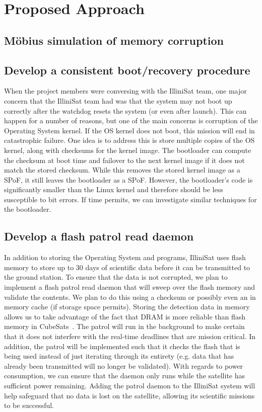 \section{Proposed Approach}
\subsection{M\"obius simulation of memory corruption}

\subsection{Develop a consistent boot/recovery procedure}
When the project members were conversing with the IlliniSat team, one major
concern that the IlliniSat team had was that the system may not boot up
correctly after the watchdog resets the system (or even after launch).  This can
happen for a number of reasons, but one of the main concerns is corruption of
the Operating System kernel.  If the OS kernel does not boot, this mission will
end in catastrophic failure.  One idea is to address this is store multiple
copies of the OS kernel, along with checksums for the kernel image.  The
bootloader can compute the checksum at boot time and failover to the next kernel
image if it does not match the stored checksum.  While this removes the stored
kernel image as a SPoF, it still leaves the bootloader as a SPoF.  However, the
bootloader's code is significantly smaller than the Linux kernel and therefore
should be less susceptible to bit errors.  If time permits, we can investigate
similar techniques for the bootloader. 

\subsection{Develop a flash patrol read daemon}
In addition to storing the Operating System and programs, IlliniSat uses flash
memory to store up to 30 days of scientific data before it can be transmitted to
the ground station.  To ensure that the data is not corrupted, we plan to
implement a flash patrol read daemon that will sweep over the flash memory and
validate the contents. We plan to do this using a checksum or possibly even an
in memory cache (if storage space permits).  Storing the detection data in
memory allows us to take advantage of the fact that DRAM is more reliable than
flash memory in CubeSats~\cite{odegaard2013error}.  The patrol will run in the
background to make certain that it does not interfere with the real-time
deadlines that are mission critical.  In addition, the patrol will be
implemented such that it checks the flash that is being used instead of just
iterating through its entirety (e.g.  data that has already been transmitted
will no longer be validated). With regards to power consumption, we can ensure
that the daemon only runs while the satellite has sufficient power remaining.
Adding the patrol daemon to the IlliniSat system will help safeguard that no
data is lost on the satellite, allowing its scientific missions to be
successful.

